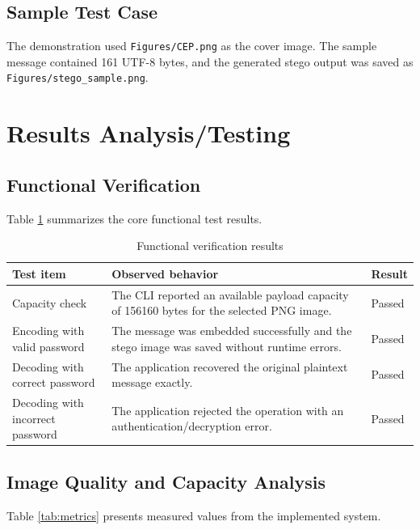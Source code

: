 \documentclass[12pt]{report}
\begin{document}
\subsection{Sample Test Case}
The demonstration used \texttt{Figures/CEP.png} as the cover image. The sample message contained 161 UTF-8 bytes, and the generated stego output was saved as \texttt{Figures/stego\_sample.png}.

\section{Results Analysis/Testing}

\subsection{Functional Verification}
Table \ref{tab:functional-results} summarizes the core functional test results.

\begin{table}[H]
    \centering
    \caption{Functional verification results}
    \label{tab:functional-results}
    \begin{tabularx}{\textwidth}{|p{5cm}|X|p{2.5cm}|}
        \hline
        \textbf{Test item} & \textbf{Observed behavior} & \textbf{Result} \\
        \hline
        Capacity check & The CLI reported an available payload capacity of 156160 bytes for the selected PNG image. & Passed \\
        \hline
        Encoding with valid password & The message was embedded successfully and the stego image was saved without runtime errors. & Passed \\
        \hline
        Decoding with correct password & The application recovered the original plaintext message exactly. & Passed \\
        \hline
        Decoding with incorrect password & The application rejected the operation with an authentication/decryption error. & Passed \\
        \hline
    \end{tabularx}
\end{table}

\subsection{Image Quality and Capacity Analysis}
Table \ref{tab:metrics} presents measured values from the implemented system.
\end{document}
